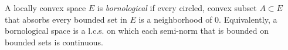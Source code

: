A locally convex space $E$ is \textit{bornological} if every circled, convex subset $A \subset E$ that absorbs every bounded set in $E$ is a neighborhood of $0$. Equivalently, a bornological space is a l.c.s. on which each semi-norm that is bounded on bounded sets is continuous.
